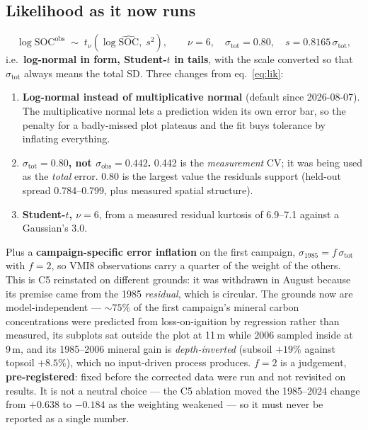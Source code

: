 \documentclass[11pt]{article}
\newcommand{\sobs}{\sigma_{\mathrm{obs}}}
\begin{document}
\subsection{Likelihood as it now runs}

\begin{equation}
\log \mathrm{SOC}^{\mathrm{obs}} \;\sim\; t_{\nu}\!\left(\log\widehat{\mathrm{SOC}},\;
  s^{2}\right), \qquad \nu = 6,\quad \sigma_{\mathrm{tot}} = 0.80,\quad
  s = 0.8165\,\sigma_{\mathrm{tot}},
\end{equation}
i.e.\ \textbf{log-normal in form, Student-$t$ in tails}, with the scale converted so that
$\sigma_{\mathrm{tot}}$ always means the total SD. Three changes from eq.~\eqref{eq:lik}:

\begin{enumerate}\itemsep2pt
\item \textbf{Log-normal instead of multiplicative normal} (default since 2026-08-07). The
  multiplicative normal lets a prediction widen its own error bar, so the penalty for a
  badly-missed plot plateaus and the fit buys tolerance by inflating everything.
\item \textbf{$\sigma_{\mathrm{tot}} = 0.80$, not $\sobs = 0.442$.} 0.442 is the \emph{measurement}
  CV; it was being used as the \emph{total} error. 0.80 is the largest value the residuals support
  (held-out spread 0.784--0.799, plus measured spatial structure).
\item \textbf{Student-$t$, $\nu = 6$}, from a measured residual kurtosis of 6.9--7.1 against a
  Gaussian's 3.0.
\end{enumerate}

\noindent Plus a \textbf{campaign-specific error inflation} on the first campaign,
$\sigma_{1985} = f\,\sigma_{\mathrm{tot}}$ with $f = 2$, so VMI8 observations carry a quarter of the
weight of the others. This is C5 reinstated on different grounds: it was withdrawn in August
because its premise came from the 1985 \emph{residual}, which is circular. The grounds now are
model-independent --- ${\sim}75\%$ of the first campaign's mineral carbon concentrations were
predicted from loss-on-ignition by regression rather than measured, its subplots sat outside the
plot at 11\,m while 2006 sampled inside at 9\,m, and its 1985--2006 mineral gain is
\emph{depth-inverted} (subsoil $+19\%$ against topsoil $+8.5\%$), which no input-driven process
produces. $f = 2$ is a judgement, \textbf{pre-registered}: fixed before the corrected data were
run and not revisited on results. It is not a neutral choice --- the C5 ablation moved the
1985--2024 change from $+0.638$ to $-0.184$ as the weighting weakened --- so it must never be
reported as a single number.
\end{document}
